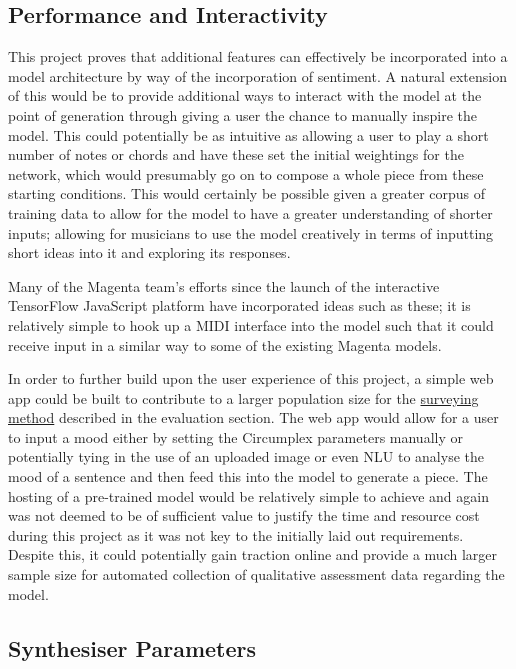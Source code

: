 \documentclass[12pt,]{article}
\begin{document}
\hypertarget{performance-and-interactivity}{%
\subsection{Performance and
Interactivity}\label{performance-and-interactivity}}

This project proves that additional features can effectively be
incorporated into a model architecture by way of the incorporation of
sentiment. A natural extension of this would be to provide additional
ways to interact with the model at the point of generation through
giving a user the chance to manually inspire the model. This could
potentially be as intuitive as allowing a user to play a short number of
notes or chords and have these set the initial weightings for the
network, which would presumably go on to compose a whole piece from
these starting conditions. This would certainly be possible given a
greater corpus of training data to allow for the model to have a greater
understanding of shorter inputs; allowing for musicians to use the model
creatively in terms of inputting short ideas into it and exploring its
responses.

Many of the Magenta team's efforts since the launch of the interactive
TensorFlow JavaScript platform have incorporated ideas such as these; it
is relatively simple to hook up a MIDI interface into the model such
that it could receive input in a similar way to some of the existing
Magenta models.

In order to further build upon the user experience of this project, a
simple web app could be built to contribute to a larger population size
for the \protect\hyperlink{qualitativesurveryingmethod}{surveying
method} described in the evaluation section. The web app would allow for
a user to input a mood either by setting the Circumplex parameters
manually or potentially tying in the use of an uploaded image or even
NLU to analyse the mood of a sentence and then feed this into the model
to generate a piece. The hosting of a pre-trained model would be
relatively simple to achieve and again was not deemed to be of
sufficient value to justify the time and resource cost during this
project as it was not key to the initially laid out requirements.
Despite this, it could potentially gain traction online and provide a
much larger sample size for automated collection of qualitative
assessment data regarding the model.

\hypertarget{synthesiser-parameters}{%
\subsection{Synthesiser Parameters}\label{synthesiser-parameters}}
\end{document}
